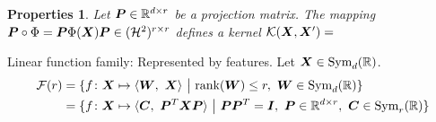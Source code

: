\documentclass[12pt]{article}
\newtheorem{prop}{Properties}
\begin{document}
\begin{prop} Let $\bm{P}\in\mathbb{R}^{d\times r}$ be a projection matrix. The mapping $\bm{P}\circ\Phi = \bm{P}\Phi(\bm X)\bm{P} \in (\mathcal{H}^2)^{r\times r}$ defines a kernel $\mathcal{K}(\bm X,\bm X')=$
\end{prop}


Linear function family:
Represented by features. Let $\bm X\in\text{Sym}_d(\mathbb{R})$. 
\begin{align}
\tF(r)&=\{ f\colon \mX\mapsto \langle \mW,\ \mX\rangle\ \big|\ \text{rank}(\mW)\leq r,\ \mW\in\text{Sym}_d(\mathbb{R})\}\\
&=\{ f\colon \mX\mapsto \langle \mC,\ \mP^T\mX\mP\rangle\ \big|\ \mP\mP^T =\mI,\ \mP\in\mathbb{R}^{d\times r},\ \mC\in\text{Sym}_r(\mathbb{R})\}
\end{align}


\end{document}
